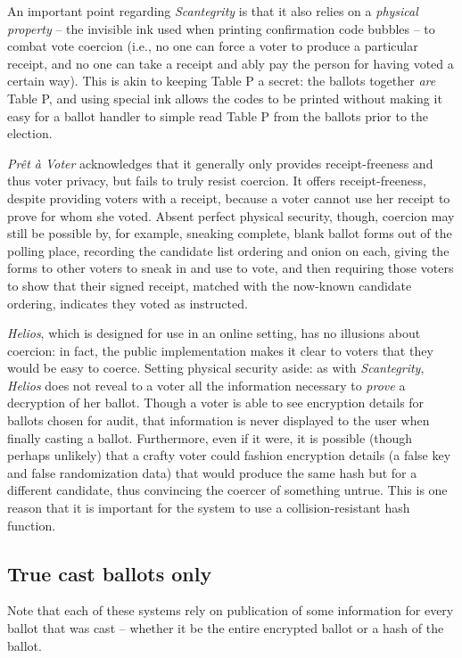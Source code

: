 \documentclass[10pt,twocolumn]{article}
\newcommand{\term}[1]{\textit{#1}}
\newcommand{\preta}{Pr\^{e}t \`{a}}
\newcommand{\pv}{\preta{} Voter}
\begin{document}
An important point regarding \term{Scantegrity} is that it also relies on a \emph{physical property} -- the
invisible ink used when printing confirmation code bubbles -- to combat vote coercion (i.e., no
one can force a voter to produce a particular receipt, and no one can take a receipt and ably pay
the person for having voted a certain way). This is akin to keeping Table P a secret: the ballots
together \emph{are} Table P, and using special ink allows the codes to be printed without making it
easy for a ballot handler to simple read Table P from the ballots prior to the election.

\term{\pv{}} acknowledges that it generally only provides receipt-freeness and thus voter privacy, but fails to
truly resist coercion. It offers receipt-freeness, despite providing voters with a receipt, because a voter
cannot use her receipt to prove for whom she voted. Absent perfect physical security, though, coercion may still be possible
by, for example, sneaking complete, blank ballot forms out of the polling place, recording the candidate list ordering and onion on each,
giving the forms to other voters to sneak in and use to vote, and then requiring those voters to show that their signed receipt, matched with the now-known candidate ordering, indicates they voted as instructed.

\term{Helios}, which is designed for use in an online setting, has no illusions about coercion: in fact,
the public implementation makes it clear to voters that they would be easy to coerce. Setting
physical security aside: as with \term{Scantegrity}, \term{Helios} does not reveal to a voter all the
information necessary to \emph{prove} a decryption of her ballot. Though a voter is able to see
encryption details for ballots chosen for audit, that information is never displayed to the user
when finally casting a ballot. Furthermore, even if it were, it is possible (though perhaps
unlikely) that a crafty voter could fashion encryption details (a false key and false randomization
data) that would produce the same hash but for a different candidate, thus convincing the coercer
of something untrue.
This is one reason that it is important for the system to use a collision-resistant hash function.

\subsection{True cast ballots only}

Note that each of these systems rely on publication of some information for every ballot that was
cast -- whether it be the entire encrypted ballot or a hash of the ballot.
\end{document}
